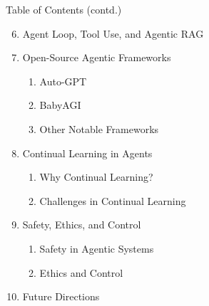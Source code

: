 \begin{frame}{Table of Contents (contd.)}
  \begin{enumerate}
    \setcounter{enumi}{5}
    \item Agent Loop, Tool Use, and Agentic RAG
    \item Open-Source Agentic Frameworks
      \begin{enumerate}
        \item Auto-GPT
        \item BabyAGI
        \item Other Notable Frameworks
      \end{enumerate}
    \item Continual Learning in Agents
      \begin{enumerate}
        \item Why Continual Learning?
        \item Challenges in Continual Learning
      \end{enumerate}
    \item Safety, Ethics, and Control
      \begin{enumerate}
        \item Safety in Agentic Systems
        \item Ethics and Control
      \end{enumerate}
    \item Future Directions
  \end{enumerate}
\end{frame}
